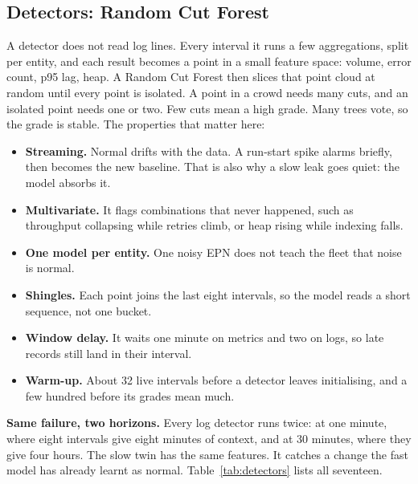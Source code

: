 \subsection{Detectors: Random Cut Forest}\label{sec:metrics-rcf}

A detector does not read log lines. Every interval it runs a few aggregations, split per entity, and each result becomes a point in a small feature space: volume, error count, p95 lag, heap. A Random Cut Forest \cite{ref:rcf} then slices that point cloud at random until every point is isolated. A point in a crowd needs many cuts, and an isolated point needs one or two. Few cuts mean a high grade. Many trees vote, so the grade is stable. The properties that matter here:

\begin{itemize}
\item \textbf{Streaming.} Normal drifts with the data. A run-start spike alarms briefly, then becomes the new baseline. That is also why a slow leak goes quiet: the model absorbs it.
\item \textbf{Multivariate.} It flags combinations that never happened, such as throughput collapsing while retries climb, or heap rising while indexing falls.
\item \textbf{One model per entity.} One noisy EPN does not teach the fleet that noise is normal.
\item \textbf{Shingles.} Each point joins the last eight intervals, so the model reads a short sequence, not one bucket.
\item \textbf{Window delay.} It waits one minute on metrics and two on logs, so late records still land in their interval.
\item \textbf{Warm-up.} About 32 live intervals before a detector leaves initialising, and a few hundred before its grades mean much.
\end{itemize}

\textbf{Same failure, two horizons.} Every log detector runs twice: at one minute, where eight intervals give eight minutes of context, and at 30 minutes, where they give four hours. The slow twin has the same features. It catches a change the fast model has already learnt as normal. Table~\ref{tab:detectors} lists all seventeen.

